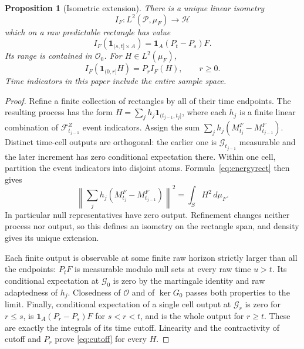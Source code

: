 \documentclass[11pt]{article}
\newtheorem{proposition}[theorem]{Proposition}
\theoremstyle{remark}\newtheorem{remark}[theorem]{Remark}
\newcommand{\one}{\mathbf1}
\newcommand{\norm}[1]{\left\lVert#1\right\rVert}
\newcommand{\HH}{\mathcal H}
\newcommand{\OO}{\mathcal O}
\newcommand{\PP}{\mathcal P}
\begin{document}
\begin{proposition}[Isometric extension]\label{prop:integral}
There is a unique linear isometry
\[
 I_F:L^2(\PP,\mu_F)\longrightarrow\HH
\]
which on a raw predictable rectangle has value
\begin{equation}\label{eq:cellintegral}
 I_F(\one_{(s,t]\times A})=\one_A(P_t-P_s)F.
\end{equation}
Its range is contained in $\OO_0$. For $H\in L^2(\mu_F)$,
\begin{equation}\label{eq:cutoff}
 I_F(\one_{(0,r]}H)=P_r I_F(H),\qquad r\geq0.
\end{equation}
Time indicators in this paper include the entire sample space.
\end{proposition}
\begin{proof}
Refine a finite collection of rectangles by all of their time endpoints.
The resulting process has the form
$H=\sum_j h_j\one_{(t_{j-1},t_j]}$, where each $h_j$ is a finite
linear combination of $\mathcal F_{t_{j-1}}^Z$ event indicators.
Assign the sum $\sum_j h_j(M_{t_j}^F-M_{t_{j-1}}^F)$.
Distinct time-cell outputs are orthogonal: the earlier one is
$\mathcal G_{t_{j-1}}$ measurable and the later increment has zero
conditional expectation there. Within one cell, partition the event
indicators into disjoint atoms. Formula~\eqref{eq:energyrect} then gives
\[
 \norm{\sum_j h_j(M_{t_j}^F-M_{t_{j-1}}^F)}^2
   =\int_S H^2\,d\mu_F.
\]
In particular null representatives have zero output. Refinement changes
neither process nor output, so this defines an isometry on the rectangle
span, and density gives its unique extension.

Each finite output is observable at some finite raw horizon strictly
larger than all the endpoints: $P_tF$ is measurable modulo null sets
at every raw time $u>t$. Its conditional expectation at $\mathcal G_0$
is zero by the martingale identity and raw adaptedness of $h_j$.
Closedness of $\OO$ and of $\ker G_0$ passes both properties to the
limit. Finally, conditional expectation of a single cell output at
$\mathcal G_r$ is zero for $r\leq s$, is
$\one_A(P_r-P_s)F$ for $s<r<t$, and is the whole output for
$r\geq t$. These are exactly the integrals of its time cutoff.
Linearity and the contractivity of cutoff and $P_r$ prove
\eqref{eq:cutoff} for every $H$.
\end{proof}
\end{document}
